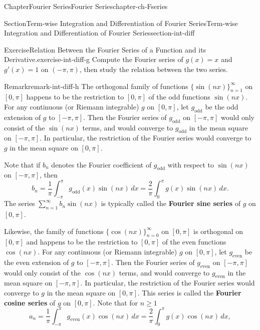 \documentclass[oneside,10pt,]{book}
\newcommand{\terminology}[1]{\textbf{#1}}
\numberwithin{equation}{section}
\begin{document}
\begin{chapterptx}{Chapter}{Fourier Series}{}{Fourier Series}{}{}{chapter-ch-Fseries}
\begin{sectionptx}{Section}{Term-wise Integration and Differentiation of Fourier Series}{}{Term-wise Integration and Differentiation of Fourier Series}{}{}{section-int-diff}
\begin{inlineexercise}{Exercise}{Relation Between the Fourier Series of a Function and its Derivative.}{exercise-int-diff-g}%
Compute the Fourier series of \(g(x)=x\) and \(g'(x)=1\) on \((-\pi, \pi)\), then study the relation between the two series.%
\end{inlineexercise}%
\begin{remark}{Remark}{}{remark-int-diff-h}%
The orthogonal family of functions \(\{\sin (nx)\}_{n=1}^{\infty}\) on \([0, \pi]\) happens to be the restriction to \([0, \pi]\) of the odd functions \(\sin(nx)\). For any continuous (or Riemann integrable) \(g\) on \([0, \pi]\), let \(g_{\text{odd}}\) be the odd extension of \(g\) to \([-\pi, \pi]\). Then the Fourier series of \(g_{\text{odd}}\) on \([-\pi, \pi]\) would only consist of the  \(\sin(nx)\) terms, and would converge to \(g_{\text{odd}}\) in the mean square on \([-\pi, \pi]\). In particular, the restriction of  the Fourier series would converge to \(g\) in the mean square on \([0, \pi]\).%
\par
Note that if \(b_{n}\) denotes the Fourier coefficient of \(g_{\text{odd}}\) with respect to \(\sin(nx)\) on \([-\pi, \pi]\), then%
\begin{equation*}
b_{n}=\frac 1\pi \int_{-\pi}^{\pi} g_{\text{odd}}(x)\sin(nx)\, dx=\frac 2\pi \int_{0}^{\pi} g(x)\sin (nx)\, dx.
\end{equation*}
The series \(\sum_{n=1}^{\infty}b_{n}\sin(nx)\) is typically called the \terminology{Fourier sine series} of \(g\) on \([0, \pi]\).%
\par
Likewise, the  family of functions \(\{\cos (nx)\}_{n=0}^{\infty}\) on \([0, \pi]\) is orthogonal on \([0,\pi]\) and happens to be the restriction to \([0, \pi]\) of the even functions \(\cos(nx)\). For any continuous (or Riemann integrable) \(g\) on \([0, \pi]\), let \(g_{\text{even}}\) be the even extension of \(g\) to \([-\pi, \pi]\). Then the Fourier series of \(g_{\text{even}}\) on \([-\pi, \pi]\) would only consist of the  \(\cos(nx)\) terms, and would converge to \(g_{\text{even}}\) in the mean square on \([-\pi, \pi]\). In particular, the restriction of  the Fourier series would converge to \(g\) in the mean square on \([0, \pi]\). This series is called the \terminology{Fourier cosine series} of \(g\) on \([0, \pi]\). Note that for \(n\ge 1\)%
\begin{equation*}
a_{n}=\frac 1\pi \int_{-\pi}^{\pi} g_{\text{even}}(x)\cos(nx)\, dx=\frac 2\pi \int_{0}^{\pi} g(x)\cos (nx)\, dx,
\end{equation*}

\end{remark}
\end{sectionptx}
\end{chapterptx}
\end{document}
